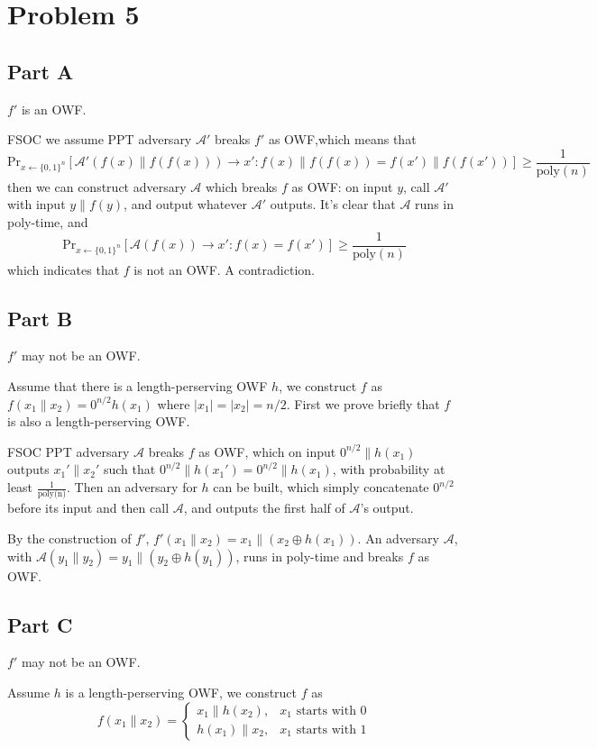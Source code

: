 \documentclass[8pt]{article}
\theoremstyle{compact}
\def\ge{\geqslant}
\begin{document}
\section*{Problem 5}

\subsection*{Part A}
$f'$ is an OWF.

FSOC we assume PPT adversary $\mathcal A'$ breaks $f'$ as OWF,which means that $$\text{Pr}_{x \gets \{0, 1\}^n}\left[\mathcal A'(f(x) \| f(f(x))) \to x': f(x) \| f(f(x)) = f(x') \| f(f(x'))\right] \ge \frac{1}{\text{poly}(n)}$$ then we can construct adversary $\mathcal A$ which breaks $f$ as OWF: on input $y$, call $\mathcal A'$ with input $y \| f(y)$, and output whatever $\mathcal A'$ outputs. It's clear that $\mathcal A$ runs in poly-time, and $$\text{Pr}_{x \gets \{0, 1\}^n}\left[\mathcal A(f(x)) \to x': f(x) = f(x') \right] \ge \frac{1}{\text{poly}(n)}$$
which indicates that $f$ is not an OWF. A contradiction.

\subsection*{Part B}
$f'$ may not be an OWF.

Assume that there is a length-perserving OWF $h$, we construct $f$ as $f(x_1 \| x_2) = 0^{n/2}h(x_1)$ where $|x_1| = |x_2| = n/2$. First we prove briefly that $f$ is also a length-perserving OWF.

FSOC PPT adversary $\mathcal A$ breaks $f$ as OWF, which on input $0^{n/2} \| h(x_1)$ outputs $x_1' \| x_2'$ such that $0^{n/2} \| h(x_1') = 0^{n/2} \| h(x_1)$, with probability at least $\frac{1}{\text{poly(n)}}$. Then an adversary for $h$ can be built, which simply concatenate $0^{n/2}$ before its input and then call $\mathcal A$, and outputs the first half of $\mathcal A$'s output.

By the construction of $f'$, $f'(x_1 \| x_2) = x_1 \| (x_2 \oplus h(x_1))$. An adversary $\mathcal A$, with $\mathcal A(y_1 \| y_2) = y_1 \| (y_2 \oplus h(y_1))$, runs in poly-time and breaks $f$ as OWF. 
\subsection*{Part C}
$f'$ may not be an OWF.

Assume $h$ is a length-perserving OWF, we construct $f$ as $$f(x_1 \| x_2) = \begin{cases}
	x_1 \| h(x_2), & x_1 \text{ starts with } 0\\
	h(x_1) \| x_2, & x_1 \text{ starts with } 1
\end{cases}$$
\end{document}

